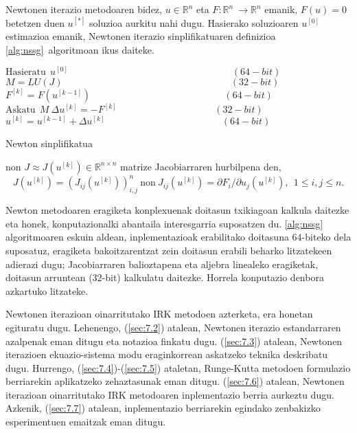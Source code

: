 Newtonen iterazio metodoaren bidez, $u\in \mathbb{R}^{n}$ eta $F: \mathbb{R}^n \ \longrightarrow {\mathbb{R}}^n$ emanik, $F(u)=0$ betetzen duen $u^{[*]}$ soluzioa aurkitu nahi dugu. Hasierako soluzioaren $u^{[0]}$ estimazioa  emanik,  Newtonen iterazio sinplifikatuaren definizioa \ref{alg:nssg}~algoritmoan ikus daiteke.

\begin{algorithm}[H]
  \BlankLine
  $ \text{Hasieratu} \ \ u^{[0]}   \quad \quad \quad \quad \quad \quad \quad \quad\quad \quad \quad \quad \quad \quad \quad \quad \quad    (64-bit)$\;
  $M=LU(J) \ \ \quad \quad \quad \quad \quad \quad \quad \quad\quad \quad \quad \quad \quad \quad \quad \quad \quad    (32-bit)$\;
  {
   \BlankLine
   $F^{[k]}=F(u^{[k-1]}) \  \quad \ \quad \quad \quad \quad \quad \quad \quad \quad \quad \quad \quad \quad \ \   (64-bit)$\;
   $\text{Askatu} \ \ M \ \Delta u^{[k]}=- F^{[k]} \ \quad \ \quad \quad \quad \quad \quad \quad \quad \quad \ \ \  (32-bit)$\;
   \BlankLine
   $u^{[k]}=u^{[k-1]}+\Delta u^{[k]}  \ \ \ \quad \quad \quad \quad\quad \quad \quad \quad \quad \quad \quad \ \     (64-bit)$\;
  }
 \caption{Newton sinplifikatua}
 \label{alg:nssg}
\end{algorithm}
%
non $J \approx J(u^{[k]}) \in \mathbb{R}^{n \times n}$ matrize Jacobiarraren hurbilpena den,
\begin{equation*}
J(u^{[k]})=(J_{ij}(u^{[k]}))_{i,j}^n \ \text{non} \ J_{ij}(u^{[k]})=\partial F_i/\partial u_j (u^{[k]}), \ \ 1 \leq i,j \leq n. 
\end{equation*} 


Newton metodoaren eragiketa konplexuenak doitasun txikiagoan kalkula daitezke \cite{Baboulin20092526} eta honek, konputazionalki abantaila interesgarria suposatzen du. \ref{alg:nssg} algoritmoaren  eskuin aldean, inplementazioak erabilitako doitasuna $64$-biteko dela suposatuz, eragiketa bakoitzarentzat zein doitasun erabili beharko litzatekeen adierazi dugu; Jacobiarraren balioztapena eta aljebra linealeko eragiketak, doitasun arruntean ($32$-bit) kalkulatu daitezke. Horrela konputazio denbora azkartuko litzateke.

Newtonen iterazioan oinarritutako IRK metodoen azterketa, era honetan egituratu dugu. Lehenengo, (\ref{sec:7.2}) atalean, Newtonen iterazio estandarraren azalpenak eman ditugu eta notazioa finkatu dugu. (\ref{sec:7.3}) atalean, Newtonen iterazioen ekuazio-sistema modu eraginkorrean askatzeko teknika deskribatu dugu. Hurrengo, (\ref{sec:7.4})-(\ref{sec:7.5}) ataletan, Runge-Kutta metodoen formulazio berriarekin aplikatzeko zehaztasunak eman ditugu. (\ref{sec:7.6}) atalean, Newtonen iterazioan oinarritutako IRK metodoaren inplementazio berria aurkeztu dugu. Azkenik, (\ref{sec:7.7}) atalean, inplementazio berriarekin egindako zenbakizko esperimentuen emaitzak eman ditugu. 

